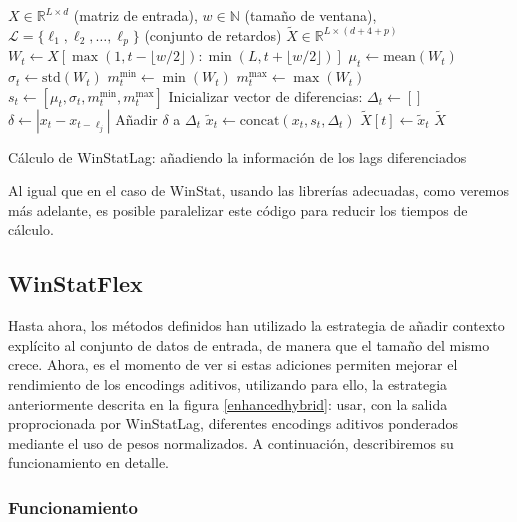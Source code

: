 \begin{algorithm}[H]
	\begin{algorithmic}[1]
		\REQUIRE 
		$X \in \mathbb{R}^{L \times d}$ (matriz de entrada), 
		$w \in \mathbb{N}$ (tamaño de ventana),
		$\mathcal{L} = \{\ell_1, \ell_2, \dots, \ell_p\}$ (conjunto de retardos)
		\ENSURE 
		$\tilde{X} \in \mathbb{R}^{L \times (d + 4 + p)}$
		\STATE $W_t \gets X[\max(1, t - \lfloor w/2 \rfloor) : \min(L, t + \lfloor w/2 \rfloor)]$
		\STATE $\mu_t \gets \text{mean}(W_t)$
		\STATE $\sigma_t \gets \text{std}(W_t)$
		\STATE $m^{\min}_t \gets \min(W_t)$
		\STATE $m^{\max}_t \gets \max(W_t)$
		\STATE $s_t \gets [\mu_t, \sigma_t, m^{\min}_t, m^{\max}_t]$
		\STATE Inicializar vector de diferencias: $\Delta_t \gets []$
		\STATE $\delta \gets |x_t - x_{t - \ell_j}|$
		\ENDIF
		\STATE Añadir $\delta$ a $\Delta_t$
		\ENDFOR
		\STATE $\tilde{x}_t \gets \text{concat}(x_t, s_t, \Delta_t)$
		\STATE $\tilde{X}[t] \gets \tilde{x}_t$
		\ENDFOR
		\RETURN $\tilde{X}$
	\end{algorithmic}
	\caption{Cálculo de WinStatLag: añadiendo la información de los lags diferenciados}
	\label{winstatlag}
\end{algorithm}

Al igual que en el caso de WinStat, usando las librerías adecuadas, como veremos más adelante, es posible paralelizar este código para reducir los tiempos de cálculo.

\subsection{WinStatFlex}

Hasta ahora, los métodos definidos han utilizado la estrategia de añadir contexto explícito al conjunto de datos de entrada, de manera que el tamaño del mismo crece. Ahora, es el momento de ver si estas adiciones permiten mejorar el rendimiento de los encodings aditivos, utilizando para ello, la estrategia anteriormente descrita en la figura \ref{enhancedhybrid}: usar, con la salida proprocionada por WinStatLag, diferentes encodings aditivos ponderados mediante el uso de pesos normalizados. A continuación, describiremos su funcionamiento en detalle.

\subsubsection{Funcionamiento}

